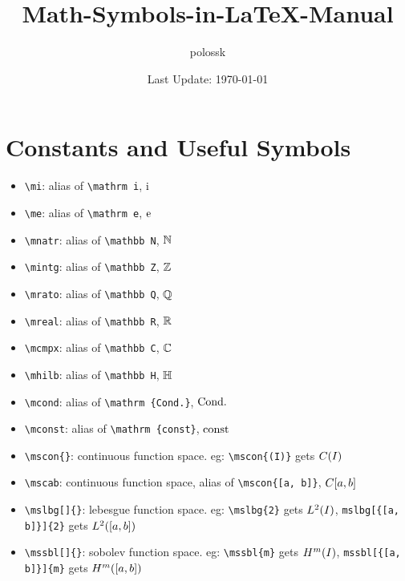 \documentclass{article}
\title{Math-Symbols-in-\LaTeX{}-Manual}
\author{polossk}
\date{Last Update: \today}
\begin{document}
\pagewiselinenumbers
\maketitle
\tableofcontents
\thispagestyle{fancy}
\renewcommand{\baselinestretch}{1.25}
\sWuhao\fSong
\section{Constants and Useful Symbols}
\begin{itemize}
\item \lstinline`\mi`: alias of \lstinline`\mathrm i`, $\mi$
\item \lstinline`\me`: alias of \lstinline`\mathrm e`, $\me$
\item \lstinline`\mnatr`: alias of \lstinline`\mathbb N`, $\mnatr$
\item \lstinline`\mintg`: alias of \lstinline`\mathbb Z`, $\mintg$
\item \lstinline`\mrato`: alias of \lstinline`\mathbb Q`, $\mrato$
\item \lstinline`\mreal`: alias of \lstinline`\mathbb R`, $\mreal$
\item \lstinline`\mcmpx`: alias of \lstinline`\mathbb C`, $\mcmpx$
\item \lstinline`\mhilb`: alias of \lstinline`\mathbb H`, $\mhilb$
\item \lstinline`\mcond`: alias of \lstinline`\mathrm {Cond.}`, $\mcond$
\item \lstinline`\mconst`: alias of \lstinline`\mathrm {const}`, $\mconst$
\item \lstinline`\mscon{}`: continuous function space. eg: \lstinline`\mscon{(I)}` gets $\mscon{(I)}$
\item \lstinline`\mscab`: continuous function space, alias of \lstinline`\mscon{[a, b]}`, $\mscab$
\item \lstinline`\mslbg[]{}`: lebesgue function space. eg: \lstinline`\mslbg{2}` gets $\mslbg{2}$, \lstinline`mslbg[{[a, b]}]{2}` gets $\mslbg[{[a, b]}]{2}$
\item \lstinline`\mssbl[]{}`: sobolev function space. eg: \lstinline`\mssbl{m}` gets $\mssbl{m}$, \lstinline`mssbl[{[a, b]}]{m}` gets $\mssbl[{[a, b]}]{m}$
\end{itemize}
\end{document}

